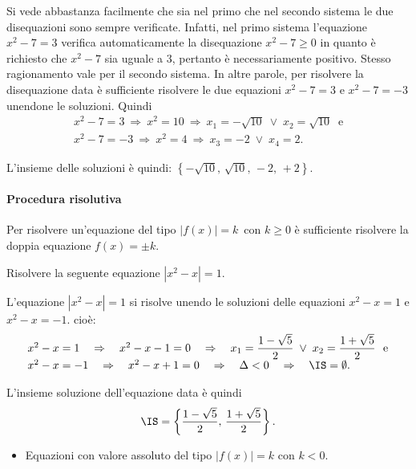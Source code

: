 \begin{exrig}
\begin{esempio}
Si vede abbastanza facilmente che sia nel primo che nel secondo sistema le due disequazioni sono sempre verificate. Infatti, nel primo sistema l'equazione $x^2-7=3$ verifica automaticamente la disequazione $x^2-7\ge 0$ in quanto è richiesto che $x^2-7$ sia uguale a $3$, pertanto è necessariamente positivo.
Stesso ragionamento vale per il secondo sistema. In altre parole, per risolvere la disequazione data è sufficiente risolvere le due equazioni $x^2-7=3$ e $x^2-7=-3$ unendone le soluzioni. Quindi
\[\begin{array}{l}x^2-7=3\:\Rightarrow\: x^2=10\:\Rightarrow\: x_1=-\sqrt{10}\;\vee\; x_2=\sqrt{10}~\text{ e} \\x^2-7=-3\:\Rightarrow\: x^2=4\:\Rightarrow\: x_3=-2\;\vee\; x_4=2.\end{array}\]

L'insieme delle soluzioni è quindi: $\left\{-\sqrt{10}\text{, }\sqrt{10}\text{, }-2\text{, }+2\right\}$.
\end{esempio}
\end{exrig}

\paragraph{Procedura risolutiva} Per risolvere un'equazione del tipo $\left|f(x)\right|=k\,\text{ con }k\ge 0$ è sufficiente risolvere la doppia equazione $f(x)=\pm k$.
\begin{exrig}
\begin{esempio}
Risolvere la seguente equazione $\left|x^2-x\right|=1$.

L'equazione $\left|x^2-x\right|=1$ si risolve unendo le soluzioni delle equazioni $x^2-x=1$ e $x^2-x=-1$. cioè:
\[\begin{array}{l}x^2-x=1\quad\Rightarrow\quad x^2-x-1=0\quad\Rightarrow\quad x_1=\dfrac{1-\sqrt 5} 2\;\vee\; x_2=\dfrac{1+\sqrt 5} 2~\text{ e} \\x^2-x=-1\quad\Rightarrow\quad x^2-x+1=0\quad\Rightarrow\quad \Delta <0\quad\Rightarrow\quad\IS=\emptyset.\end{array}\]

L'insieme soluzione dell'equazione data è quindi \[\IS=\left\{\dfrac{1-\sqrt 5} 2\text{, }\dfrac{1+\sqrt 5} 2\right\}.\]
\end{esempio}
\end{exrig}

\begin{itemize}
\item Equazioni con valore assoluto del tipo ${\left|f(x)\right|=k\text{ con }k<0}$.
\end{itemize}

